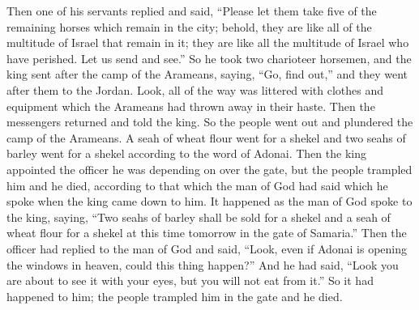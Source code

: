 \begin{biblechapter}
\verse Then one of his servants replied and said, “Please let them take five of the remaining horses which remain in the city; behold, they are like all of the multitude of Israel that remain in it; they are like all the multitude of Israel who have perished. Let us send and see.”
\verse So he took two charioteer horsemen, and the king sent after the camp of the Arameans, saying, “Go, find out,”
\verse and they went after them to the Jordan. Look, all of the way was littered with clothes and equipment which the Arameans had thrown away in their haste. Then the messengers returned and told the king.
 So the people went out and plundered the camp of the Arameans. A seah of wheat flour went for a shekel and two seahs of barley went for a shekel according to the word of Adonai.
\verse Then the king appointed the officer he was depending on over the gate, but the people trampled him and he died, according to that which the man of God had said which he spoke when the king came down to him.
\verse It happened as the man of God spoke to the king, saying, “Two seahs of barley shall be sold for a shekel and a seah of wheat flour for a shekel at this time tomorrow in the gate of Samaria.”
\verse Then the officer had replied to the man of God and said, “Look, even if Adonai is opening the windows in heaven, could this thing happen?” And he had said, “Look you are about to see it with your eyes, but you will not eat from it.”
\verse So it had happened to him; the people trampled him in the gate and he died.
\end{biblechapter}

